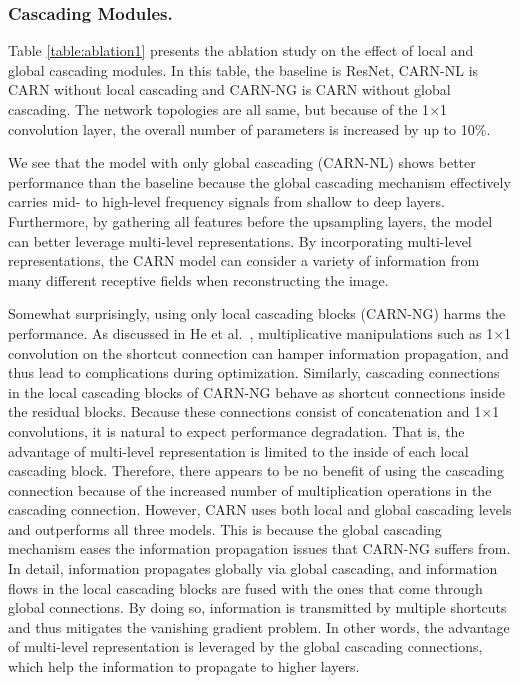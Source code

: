 \documentclass[runningheads]{llncs}
\begin{document}
\subsubsection{Cascading Modules.}
Table \ref{table:ablation1} presents the ablation study on the effect of local and global cascading modules. In this table, the baseline is ResNet, CARN-NL is CARN without local cascading and CARN-NG is CARN without global cascading. The network topologies are all same, but because of the 1$\times$1 convolution layer, the overall number of parameters is increased by up to 10\%.

We see that the model with only global cascading (CARN-NL) shows better performance than the baseline because the global cascading mechanism effectively carries mid- to high-level frequency signals from shallow to deep layers. Furthermore, by gathering all features before the upsampling layers, the model can better leverage multi-level representations. By incorporating multi-level representations, the CARN model can consider a variety of information from many different receptive fields when reconstructing the image.

Somewhat surprisingly, using only local cascading blocks (CARN-NG) harms the performance. As discussed in He et al.~\cite{he2016identity}, multiplicative manipulations such as 1$\times$1 convolution on the shortcut connection can hamper information propagation, and thus lead to complications during optimization. Similarly, cascading connections in the local cascading blocks of CARN-NG behave as shortcut connections inside the residual blocks. Because these connections consist of concatenation and 1$\times$1 convolutions, it is natural to expect performance degradation. That is, the advantage of multi-level representation is limited to the inside of each local cascading block. Therefore, there appears to be no benefit of using the cascading connection because of the increased number of multiplication operations in the cascading connection. However, CARN uses both local and global cascading levels and outperforms all three models. This is because the global cascading mechanism eases the information propagation issues that CARN-NG suffers from. In detail, information propagates globally via global cascading, and information flows in the local cascading blocks are fused with the ones that come through global connections. By doing so, information is transmitted by multiple shortcuts and thus mitigates the vanishing gradient problem. In other words, the advantage of multi-level representation is leveraged by the global cascading connections, which help the information to propagate to higher layers.
\end{document}
